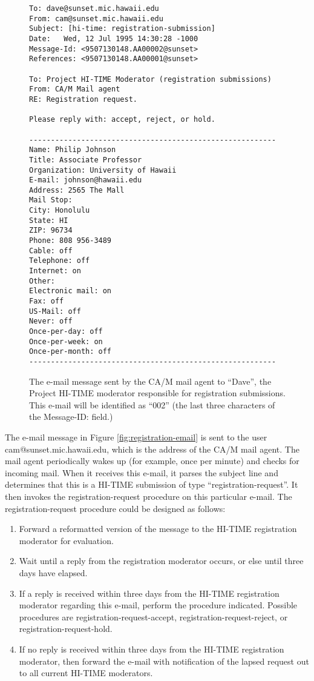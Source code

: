 \begin{figure}[htbp]
\small\begin{verbatim}
To: dave@sunset.mic.hawaii.edu
From: cam@sunset.mic.hawaii.edu
Subject: [hi-time: registration-submission]
Date: 	Wed, 12 Jul 1995 14:30:28 -1000
Message-Id: <9507130148.AA00002@sunset>
References: <9507130148.AA00001@sunset>

To: Project HI-TIME Moderator (registration submissions)
From: CA/M Mail agent
RE: Registration request.

Please reply with: accept, reject, or hold.

---------------------------------------------------------
Name: Philip Johnson
Title: Associate Professor
Organization: University of Hawaii
E-mail: johnson@hawaii.edu
Address: 2565 The Mall
Mail Stop: 
City: Honolulu
State: HI
ZIP: 96734
Phone: 808 956-3489
Cable: off
Telephone: off
Internet: on
Other:
Electronic mail: on
Fax: off
US-Mail: off
Never: off
Once-per-day: off
Once-per-week: on
Once-per-month: off
---------------------------------------------------------
\end{verbatim}\normalsize
\caption{The e-mail message sent by the CA/M mail agent to ``Dave'', the Project
HI-TIME moderator responsible for registration submissions.
This e-mail will be identified as ``002'' (the last three characters of the
Message-ID: field.)}
\label{fig:registration-email-moderator}
\end{figure}

The e-mail message in Figure \ref{fig:registration-email} is sent to 
the user cam@sunset.mic.hawaii.edu, which is the address of the CA/M 
mail agent.  The mail agent periodically wakes up (for example, once
per minute) and checks for incoming mail.  When it receives this e-mail,
it parses the subject line and determines that this is a HI-TIME submission of  
type ``registration-request''.  It then invokes the registration-request 
procedure on this particular e-mail.  The registration-request procedure
could be designed as follows:

\begin{enumerate}
\item Forward a reformatted version of the message to the HI-TIME registration moderator for evaluation.
\item Wait until a reply from the registration moderator occurs, or else
until three days have elapsed. 
\item If a reply is received within three days from the HI-TIME
registration moderator 
regarding this e-mail, perform the procedure indicated. Possible
procedures are registration-request-accept, registration-request-reject, or
registration-request-hold.
\item If no reply is received within three days from the HI-TIME 
registration moderator, then forward the e-mail with notification of 
the lapsed request out to all current HI-TIME moderators. 
\end{enumerate}

